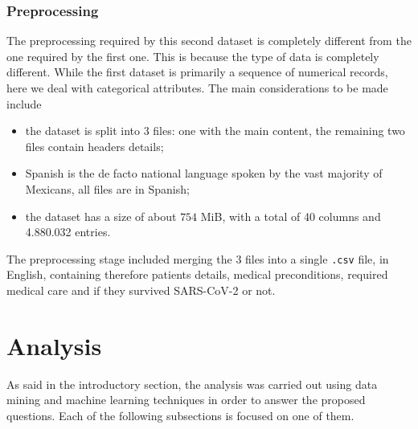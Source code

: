 \documentclass[11pt,a4paper]{article}
\begin{document}
\subsubsection{Preprocessing}
The preprocessing required by this second dataset is completely different from
the one required  by the first one. This is because the type of data is
completely different. While the first dataset is primarily a sequence of
numerical records, here we deal with categorical attributes. The main
considerations to be made include
\begin{itemize}
    \item the dataset is split into $3$ files: one with the main content, the
    remaining two files contain headers details;
    \item Spanish is the de facto national language spoken by the vast majority
    of Mexicans, all files are in Spanish;
    \item the dataset has a size of about $754$ MiB, with a total of 40 columns
    and 4.880.032 entries.
\end{itemize}
The preprocessing stage included merging the 3 files into a single \texttt{.csv}
file, in English, containing therefore patients details, medical preconditions,
required medical care and if they survived SARS-CoV-2 or not.

\newpage
\section{Analysis}
As said in the introductory section, the analysis was carried out using data
mining and machine learning techniques in order to answer the proposed
questions. Each of the following subsections is focused on one of them.
\end{document}
